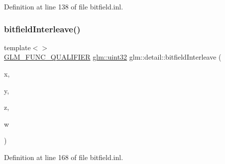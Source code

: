 Definition at line 138 of file bitfield.\+inl.

\mbox{\label{namespaceglm_1_1detail_ae3f57ec9a2b938eb31978ccb99f85474}} 
\subsubsection{\texorpdfstring{bitfieldInterleave()}{bitfieldInterleave()}\hspace{0.1cm}{\footnotesize\ttfamily [10/11]}}
{\footnotesize\ttfamily template$<$$>$ \\
\mbox{\hyperlink{setup_8hpp_a33fdea6f91c5f834105f7415e2a64407}{G\+L\+M\+\_\+\+F\+U\+N\+C\+\_\+\+Q\+U\+A\+L\+I\+F\+I\+ER}} \mbox{\hyperlink{group__gtc__type__precision_ga202b6a53c105fcb7e531f9b443518451}{glm\+::uint32}} glm\+::detail\+::bitfield\+Interleave (\begin{DoxyParamCaption}\item[{\mbox{\hyperlink{group__gtc__type__precision_ga1a7dcd8aac97cc8020817c94049deff2}{glm\+::uint8}}}]{x,  }\item[{\mbox{\hyperlink{group__gtc__type__precision_ga1a7dcd8aac97cc8020817c94049deff2}{glm\+::uint8}}}]{y,  }\item[{\mbox{\hyperlink{group__gtc__type__precision_ga1a7dcd8aac97cc8020817c94049deff2}{glm\+::uint8}}}]{z,  }\item[{\mbox{\hyperlink{group__gtc__type__precision_ga1a7dcd8aac97cc8020817c94049deff2}{glm\+::uint8}}}]{w }\end{DoxyParamCaption})}



Definition at line 168 of file bitfield.\+inl.

\mbox{\label{namespaceglm_1_1detail_a3ed141c5adbf2e1209ffe2081d98ba4c}} 
